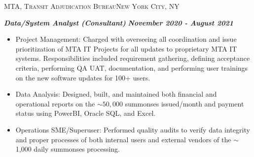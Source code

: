 \documentclass[a4paper]{article}
\newcommand{\jobtitle} [1] {
    {\hspace*{-18pt} \textsc{#1}}
    
}
\begin{document}
\begin{itemize}[leftmargin=10pt,align=left]
\end{itemize}

\jobtitle{MTA, Transit Adjudication Bureau\hfill New York City, NY}
\hspace*{-16pt}\textit{\textbf{Data/System Analyst (Consultant)}} \hfill \textit{\textbf{November 2020 - August 2021}}\\
\vspace{-1mm}
\begin{itemize}[leftmargin=10pt,align=left] \itemsep 1pt
    \item Project Management: Charged with overseeing all coordination and issue prioritization of MTA IT Projects for all updates to proprietary MTA IT systems.
            Responsibilities included requirement gathering, defining acceptance criteria, performing QA UAT, documentation, and performing user trainings on the new software updates for 100+ users.
	\item Data Analysis: Designed, built, and maintained both financial and operational reports on the $\sim50,000$ summonses issued/month and payment status using PowerBI, Oracle SQL, and Excel.
    \item Operations SME/Superuser: Performed quality audits to verify data integrity and proper processes of both internal users and external vendors of the $\sim$1,000 daily summonses processing.
\end{itemize}
\end{document}
